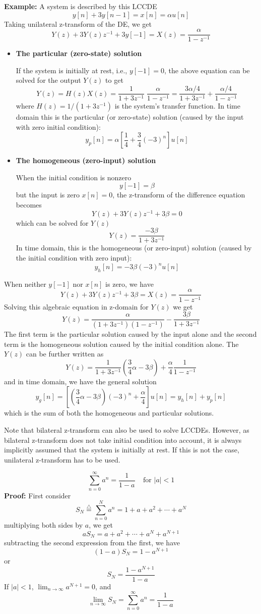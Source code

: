 {\bf Example: } A system is described by this LCCDE
\[	y[n]+3y[n-1]=x[n]=\alpha u[n]	\]
Taking unilateral z-transform of the DE, we get
\[	Y(z)+3Y(z)z^{-1}+3y[-1]=X(z)=\frac{\alpha}{1-z^{-1}}	\]
\begin{itemize}
\item {\bf The particular (zero-state) solution}

If the system is initially at rest, i.e., $y[-1]=0$, the above equation can 
be solved for the output $Y(z)$ to get
\[	Y(z)=H(z)X(z)=\frac{1}{1+3z^{-1}}\;\frac{\alpha}{1-z^{-1}}
	=\frac{3\alpha/4}{1+3z^{-1}}+\frac{\alpha/4}{1-z^{-1}}	\]	
where $H(z)=1/(1+3z^{-1})$ is the system's transfer function. In time domain
this is the particular (or zero-state) solution (caused by the input with 
zero initial condition):
\[ y_p[n]=\alpha[\frac{1}{4}+\frac{3}{4}(-3)^n]u[n]	\]

\item {\bf The homogeneous (zero-input) solution}

When the initial condition is nonzero 
\[	y[-1]=\beta	\]
but the input is zero $x[n]=0$, the z-transform of the difference equation 
becomes
\[	Y(z)+3Y(z)z^{-1}+3\beta=0	\]
which can be solved for $Y(z)$ 
\[	Y(z)=\frac{-3\beta}{1+3z^{-1}}	\]
In time domain, this is the homogeneous (or zero-input) solution (caused by the
initial condition with zero input):
\[	y_h[n]=-3\beta (-3)^n u[n]	\]
\end{itemize}
When neither $y[-1]$ nor $x[n]$ is zero, we have
\[	Y(z)+3Y(z)z^{-1}+3\beta=X(z)=\frac{\alpha}{1-z^{-1}}	\]
Solving this algebraic equation in z-domain for $Y(z)$ we get
\[	Y(z)=\frac{\alpha}{(1+3z^{-1})(1-z^{-1})}-\frac{3\beta}{1+3z^{-1}} \]
The first term is the particular solution caused by the input alone and the 
second term is the homogeneous solution caused by the initial condition alone.
The $Y(z)$ can be further written as
\[	Y(z)=\frac{1}{1+3z^{-1}}(\frac{3}{4}\alpha-3\beta)
	+\frac{\alpha}{4}\frac{1}{1-z^{-1}}
\]
and in time domain, we have the general solution
\[	y_g[n]=[(\frac{3}{4}\alpha-3\beta)(-3)^n+\frac{\alpha}{4}]u[n]
	=y_h[n]+y_p[n]	\]
which is the sum of both the homogeneous and particular solutions.

Note that bilateral z-transform can also be used to solve LCCDEs. However,
as bilateral z-transform does not take initial condition into account, it is
always implicitly assumed that the system is initially at rest. If this is not 
the case, unilateral z-transform has to be used.


\[	\sum_{n=0}^\infty a^n=\frac{1}{1-a}\;\;\;\;\mbox{for $|a|<1$} \]
{\bf Proof:}
First consider
\[	S_N\stackrel{\triangle}{=}\sum_{n=0}^N a^n=1+a+a^2+\cdots+a^N \]
multiplying both sides by $a$, we get
\[	aS_N=a+a^2+\cdots+a^N+a^{N+1} \]
subtracting the second expression from the first, we have
\[	(1-a)S_N=1-a^{N+1}	\]
or
\[	S_N=\frac{1-a^{N+1}}{1-a}	\]
If $|a|<1$, $\lim_{n\rightarrow \infty}a^{N+1}=0$, and
\[	\lim_{n\rightarrow \infty}S_N=\sum_{n=0}^\infty a^n=\frac{1}{1-a} \]



